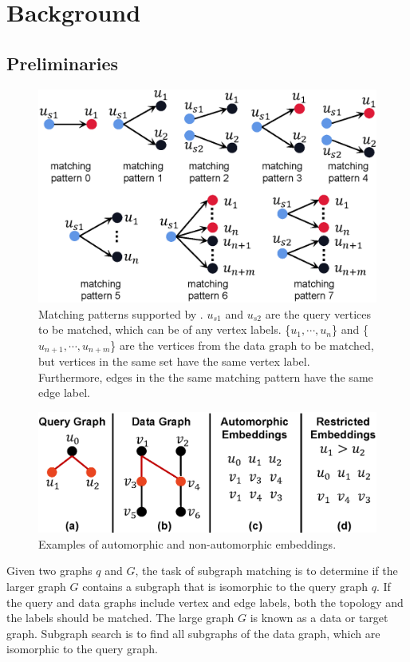 \section{Background}

\subsection{Preliminaries\label{sec:pre}}

\begin{figure}[t!]
\centering
\includegraphics[width=0.8\columnwidth]{./figure/extpattern.eps}
\caption{Matching patterns supported by \SystemName. $u_{s1}$ and $u_{s2}$ are the query vertices to be matched, which can be of any vertex labels. \{$u_1, \cdots, u_{n}$\} and
\{$u_{n+1}, \cdots, u_{n+m}$\} are the vertices from the data graph to be matched, but vertices in the same set have the same vertex label. Furthermore, edges in the the same matching pattern have the same edge label.}
\label{fig:matchpattern}
\end{figure}

\begin{figure}[t!]
\centering
\includegraphics[width=0.8\columnwidth]{./figure/automorphism.eps}
\caption{Examples of automorphic and non-automorphic embeddings.}	
\label{fig:automo}
\end{figure}


Given two graphs $q$ and $G$, the task of subgraph matching is to determine if the larger graph $G$ contains a subgraph that is isomorphic
to the query graph $q$. If the query and data graphs include vertex and edge labels, both the topology and the labels should be matched.
The large graph $G$ is known as a data or target graph.  Subgraph search is to find all subgraphs  of the data graph, which are isomorphic
to the query graph.

